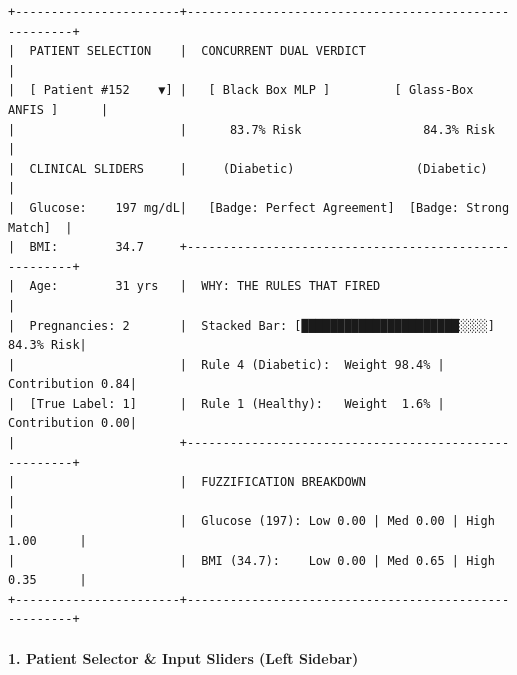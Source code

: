 \documentclass[10pt,a4paper]{article}
\begin{document}
\begin{verbatim}
+-----------------------+------------------------------------------------------+
|  PATIENT SELECTION    |  CONCURRENT DUAL VERDICT                             |
|  [ Patient #152    ▼] |   [ Black Box MLP ]         [ Glass-Box ANFIS ]      |
|                       |      83.7% Risk                 84.3% Risk           |
|  CLINICAL SLIDERS     |     (Diabetic)                 (Diabetic)            |
|  Glucose:    197 mg/dL|   [Badge: Perfect Agreement]  [Badge: Strong Match]  |
|  BMI:        34.7     +------------------------------------------------------+
|  Age:        31 yrs   |  WHY: THE RULES THAT FIRED                           |
|  Pregnancies: 2       |  Stacked Bar: [██████████████████████░░░░] 84.3% Risk|
|                       |  Rule 4 (Diabetic):  Weight 98.4% | Contribution 0.84|
|  [True Label: 1]      |  Rule 1 (Healthy):   Weight  1.6% | Contribution 0.00|
|                       +------------------------------------------------------+
|                       |  FUZZIFICATION BREAKDOWN                             |
|                       |  Glucose (197): Low 0.00 | Med 0.00 | High 1.00      |
|                       |  BMI (34.7):    Low 0.00 | Med 0.65 | High 0.35      |
+-----------------------+------------------------------------------------------+
\end{verbatim}

\paragraph{1. Patient Selector \& Input Sliders (Left
Sidebar)}\label{patient-selector-input-sliders-left-sidebar}
\end{document}
